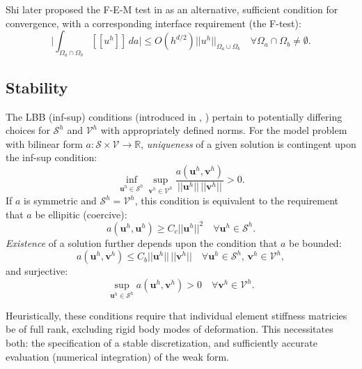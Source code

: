 	Shi later proposed the F-E-M test in \cite{Shi:87} as an alternative, sufficient condition for convergence, with a corresponding interface requirement (the F-test):
	\begin{equation}
		\bigg| \int_{\Omega_a \cap \Omega_b} [\![ u^h ]\!] \, da \bigg| \leq O(h^{d/2}) ||u^h||_{\Omega_a \cup \Omega_b} \quad \forall \Omega_a \cap \Omega_b \neq \emptyset.
	\end{equation}
	
	
\subsection*{Stability}

	The LBB (inf-sup) conditions (introduced in \cite{Babuska:71}, \cite{Brezzi:74}) pertain to potentially differing choices for $\mathcal{S}^h$ and $\mathcal{V}^h$ with appropriately defined norms. For the model problem with bilinear form $a \colon \mathcal{S} \times \mathcal{V} \rightarrow \mathbb{R}$, \textit{uniqueness} of a given solution is contingent upon the inf-sup condition:
	\begin{equation}
		\inf_{\mathbf{u}^h \in \mathcal{S}^h} \sup_{\mathbf{v}^h \in 
\mathcal{V}^h} \frac{a(\mathbf{u}^h,\mathbf{v}^h)}{||\mathbf{u}^h|| \, ||\mathbf{v}^h||} > 0.
	\end{equation}
	If $a$ is symmetric and $\mathcal{S}^h = \mathcal{V}^h$, this condition is equivalent to the requirement that $a$ be ellipitic (coercive):
	\begin{equation}
		a(\mathbf{u}^h,\mathbf{u}^h) \geq C_c ||\mathbf{u}^h||^2 \quad \forall \mathbf{u}^h \in \mathcal{S}^h.
	\end{equation}
	\textit{Existence} of a solution further depends upon the condition that $a$ be bounded:
	\begin{equation}
		a(\mathbf{u}^h,\mathbf{v}^h) \leq C_b ||\mathbf{u}^h|| \, ||\mathbf{v}^h|| \quad \forall \mathbf{u}^h \in \mathcal{S}^h, \, \mathbf{v}^h \in \mathcal{V}^h,
	\end{equation}
	and surjective:
	\begin{equation}
		\sup_{\mathbf{u}^h \in 
\mathcal{S}^h} a(\mathbf{u}^h,\mathbf{v}^h) > 0 \quad \forall \mathbf{v}^h \in \mathcal{V}^h.
	\end{equation}
	
	Heuristically, these conditions require that individual element stiffness matricies be of full rank, excluding rigid body modes of deformation. This necessitates both: the specification of a stable discretization, and sufficiently accurate evaluation (numerical integration) of the weak form.
	
